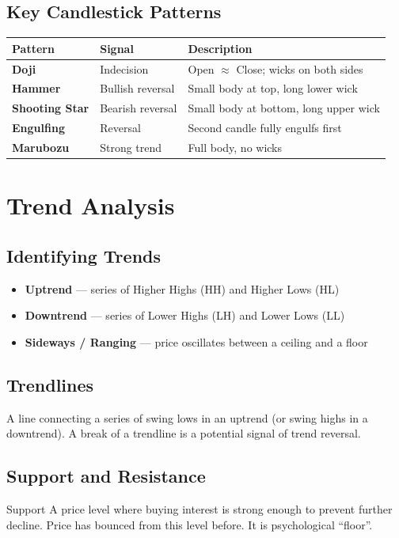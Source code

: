 \subsection{Key Candlestick Patterns}

\begin{center}
\begin{tabular}{>{\bfseries}p{3.5cm} p{3cm} p{6cm}}
\toprule
Pattern & Signal & Description \\
\midrule
Doji & Indecision & Open $\approx$ Close; wicks on both sides \\
Hammer & Bullish reversal & Small body at top, long lower wick \\
Shooting Star & Bearish reversal & Small body at bottom, long upper wick \\
Engulfing & Reversal & Second candle fully engulfs first \\
Marubozu & Strong trend & Full body, no wicks \\
\bottomrule
\end{tabular}
\end{center}

\section{Trend Analysis}

\subsection{Identifying Trends}
\begin{itemize}
  \item \textbf{Uptrend} — series of Higher Highs (HH) and Higher Lows (HL)
  \item \textbf{Downtrend} — series of Lower Highs (LH) and Lower Lows (LL)
  \item \textbf{Sideways / Ranging} — price oscillates between a ceiling and a floor
\end{itemize}

\subsection{Trendlines}
A line connecting a series of swing lows in an uptrend (or swing highs in a downtrend).
A break of a trendline is a potential signal of trend reversal.

\subsection{Support and Resistance}
\begin{keyterm}{Support}
A price level where buying interest is strong enough to prevent further decline. Price has
bounced from this level before. It is psychological ``floor''.
\end{keyterm}


